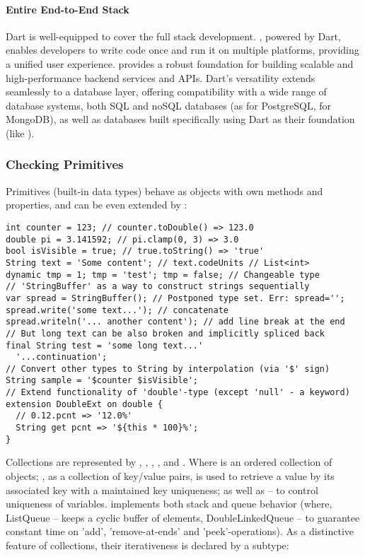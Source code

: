 \paragraph{Entire End-to-End Stack}

Dart is well-equipped to cover the full stack development. , powered by Dart, enables developers to write 
code once and run it on multiple platforms, providing a unified user experience.  provides a robust 
foundation for building scalable and high-performance backend services and APIs. Dart's versatility extends 
seamlessly to a database layer, offering compatibility with a wide range of database systems, both SQL and 
noSQL databases (as  for PostgreSQL,  for MongoDB), as well as databases built specifically 
using Dart as their foundation (like ).


\newpage
\subsubsection{Checking Primitives} \label{dart-prim}

Primitives (built-in data types) behave as objects with own methods and properties, and can be even extended 
by :

\begin{lstlisting}
int counter = 123; // counter.toDouble() => 123.0
double pi = 3.141592; // pi.clamp(0, 3) => 3.0
bool isVisible = true; // true.toString() => 'true'
String text = 'Some content'; // text.codeUnits // List<int>
dynamic tmp = 1; tmp = 'test'; tmp = false; // Changeable type
// 'StringBuffer' as a way to construct strings sequentially
var spread = StringBuffer(); // Postponed type set. Err: spread='';
spread.write('some text...'); // concatenate
spread.writeln('... another content'); // add line break at the end
// But long text can be also broken and implicitly spliced back
final String test = 'some long text...'
  '...continuation';
// Convert other types to String by interpolation (via '$' sign)
String sample = '$counter $isVisible';
// Extend functionality of 'double'-type (except 'null' - a keyword)
extension DoubleExt on double {
  // 0.12.pcnt => '12.0%'
  String get pcnt => '${this * 100}%';
}
\end{lstlisting}

\noindent Collections are represented by , , , , and . Where  is an 
ordered collection of objects; , as a collection of key/value pairs, is used to retrieve a value by its 
associated key with a maintained key uniqueness; as well as  -- to control uniqueness of variables.  
implements both stack and queue behavior (where, ListQueue -- keeps a cyclic buffer of elements, DoubleLinkedQueue -- 
to guarantee constant time on 'add', 'remove-at-ends' and 'peek'-operations). As a distinctive feature of collections, 
their iterativeness is declared by a subtype:

